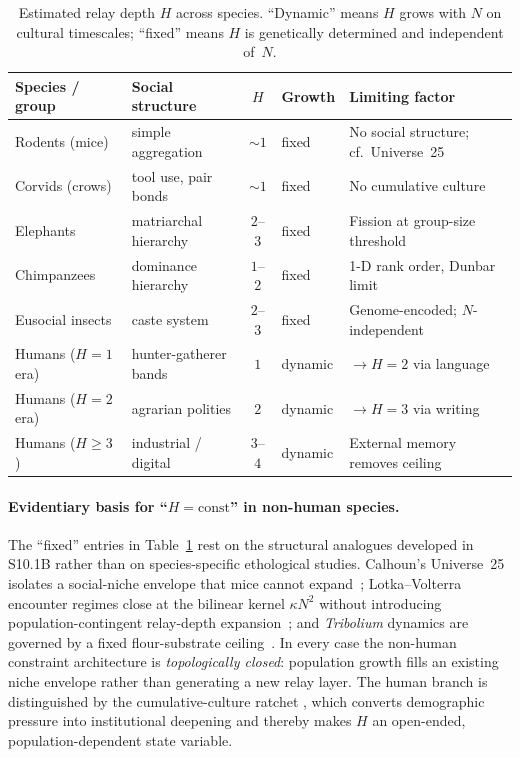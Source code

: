 \documentclass[11pt]{article}
\begin{document}
\begin{table}[h]
\centering
\caption{Estimated relay depth $H$ across species.
  ``Dynamic'' means $H$ grows with $N$ on cultural timescales;
  ``fixed'' means $H$ is genetically determined and independent of~$N$.}
\label{tab:species_H}
\small
\begin{tabular}{llcll}
\hline
Species / group & Social structure & $H$ & Growth & Limiting factor \\
\hline
Rodents (mice) & simple aggregation & ${\sim}1$ & fixed & No social structure; cf.\ Universe~25 \\
Corvids (crows) & tool use, pair bonds & ${\sim}1$ & fixed & No cumulative culture \\
Elephants & matriarchal hierarchy & $2$--$3$ & fixed & Fission at group-size threshold \\
Chimpanzees & dominance hierarchy & $1$--$2$ & fixed & 1-D rank order, Dunbar limit \\
Eusocial insects & caste system & $2$--$3$ & fixed & Genome-encoded; $N$-independent \\
\hline
Humans ($H\!=\!1$ era) & hunter-gatherer bands & $1$ & dynamic & $\to H\!=\!2$ via language \\
Humans ($H\!=\!2$ era) & agrarian polities & $2$ & dynamic & $\to H\!=\!3$ via writing \\
Humans ($H \ge 3$) & industrial / digital & $3$--$4$ & dynamic & External memory removes ceiling \\
\hline
\end{tabular}
\end{table}

\paragraph{Evidentiary basis for ``$H = \mathrm{const}$'' in non-human species.}
The ``fixed'' entries in Table~\ref{tab:species_H} rest on the structural
analogues developed in S10.1B rather than on species-specific ethological
studies.  Calhoun's Universe~25 isolates a social-niche envelope that mice
cannot expand~\cite{calhoun1973}; Lotka--Volterra encounter regimes close
at the bilinear kernel $\kappa N^{2}$ without introducing
population-contingent relay-depth expansion~\cite{lotka1925,volterra1926};
and \textit{Tribolium} dynamics are governed by a fixed flour-substrate
ceiling~\cite{park1948,costantino1997}.  In every case the non-human
constraint architecture is \emph{topologically closed}: population growth
fills an existing niche envelope rather than generating a new relay layer.
The human branch is distinguished by the cumulative-culture ratchet
\cite{boydricherson1985,tomasello1999}, which converts demographic
pressure into institutional deepening and thereby makes $H$ an
open-ended, population-dependent state variable.
\end{document}
